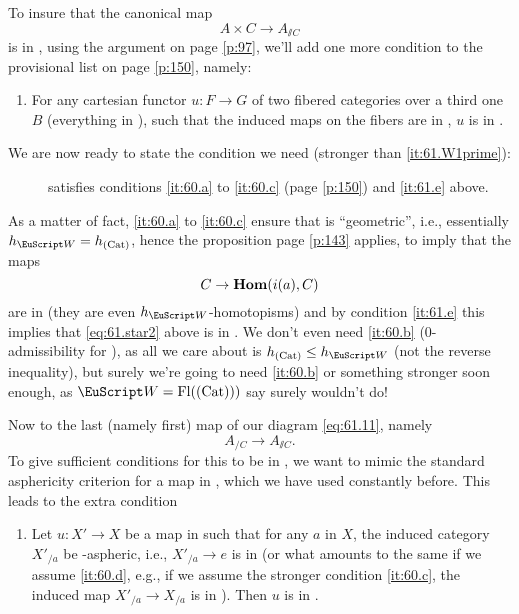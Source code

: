 To insure that the canonical map
\begin{equation}
  \label{eq:61.star2}
  A\times C\to A_{\sslash C}\tag{*}
\end{equation}
is in \scrW, using the argument on page \ref{p:97}, we'll add one more
condition to the provisional list on page \ref{p:150}, namely:
\begin{enumerate}[label=\alph*),start=5]
\item\label{it:61.e}
  For any cartesian functor $u:F\to G$ of two fibered categories over
  a third one $B$ (everything in \Cat), such that the induced maps on
  the fibers are in \scrW, $u$ is in \scrW.
\end{enumerate}
We are now ready to state the condition we need (stronger than
\ref{it:61.W1prime}):
\begin{description}
\item[]
  \scrW{} satisfies conditions \ref{it:60.a} to \ref{it:60.c} (page
  \ref{p:150}) and \ref{it:61.e} above.
\end{description}

As a matter of fact, \ref{it:60.a} to \ref{it:60.c} ensure that
\scrW{} is ``geometric'', i.e., essentially $h_\scrW = h_\Cat$, hence
the proposition page \ref{p:143} applies, to imply that the maps
\[C \to \operatorname{\mathbf{Hom}}(i(a), C)\]
are in \scrW{} (they are even $h_\scrW$-homotopisms) and by condition
\ref{it:61.e} this implies that \eqref{eq:61.star2} above is in
\scrW. We don't even need \ref{it:60.b} ($0$-admissibility for \scrW),
as all we care about is $h_\Cat\le h_\scrW$ (not the reverse
inequality), but surely we're going to need \ref{it:60.b} or something
stronger soon enough, as $\scrW=\Fl(\Cat))$ say surely wouldn't do!

Now to the last (namely first) map of our diagram \eqref{eq:61.11},
namely
\begin{equation}
  \label{eq:61.12}
  A_{/C} \to A_{\sslash C}.\tag{12}
\end{equation}
To give sufficient conditions for this to be in \scrW, we want to
mimic the standard asphericity criterion for a map in \Cat, which we
have used constantly before. This leads to the extra
condition
\begin{enumerate}[label=\alph*),resume]
\item\label{it:61.f}
  Let $u:X'\to X$ be a map in \Cat{} such that for any $a$
  in $X$, the induced category $X'_{/a}$ be \scrW-aspheric, i.e.,
  $X'_{/a}\to e$ is in \scrW{} (or what amounts to the same if we
  assume \ref{it:60.d}, e.g., if we assume the stronger condition
  \ref{it:60.c}, the induced map $X'_{/a}\to X_{/a}$ is in
  \scrW). Then $u$ is in \scrW.
\end{enumerate}

